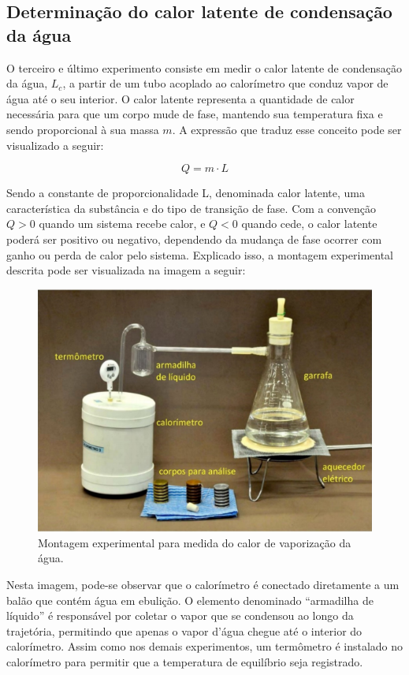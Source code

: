 \subsection{Determinação do calor latente de condensação da água}

O terceiro e último experimento consiste em medir o calor latente de condensação da água, $L_c$, a partir de um tubo acoplado ao calorímetro que conduz vapor de água até o seu interior. O calor latente representa a quantidade de calor necessária para que um corpo mude de fase, mantendo sua temperatura fixa e sendo proporcional à sua massa $m$. A expressão que traduz esse conceito pode ser visualizado a seguir:

\[ Q = m \cdot L\]

Sendo a constante de proporcionalidade L, denominada calor latente, uma característica da substância e do tipo de transição de fase. Com a convenção $Q>0$ quando um sistema recebe calor, e $Q<0$ quando cede, o calor latente poderá ser positivo ou negativo, dependendo da mudança de fase ocorrer com ganho ou perda de calor pelo sistema. Explicado isso, a montagem experimental descrita pode ser visualizada na imagem a seguir:

\begin{figure}[H]
  \centering
  \includegraphics[scale=0.75]{images/Montagem experimental.png}
  \caption{Montagem experimental para medida do calor de vaporização da água.}
\end{figure}

Nesta imagem, pode-se observar que o calorímetro é conectado diretamente a um balão que contém água em ebulição. O elemento denominado “armadilha de líquido” é responsável por coletar o vapor que se condensou ao longo da trajetória, permitindo que apenas o vapor d’água chegue até o interior do calorímetro. Assim como nos demais experimentos, um termômetro é instalado no calorímetro para permitir que a temperatura de equilíbrio seja registrado.

